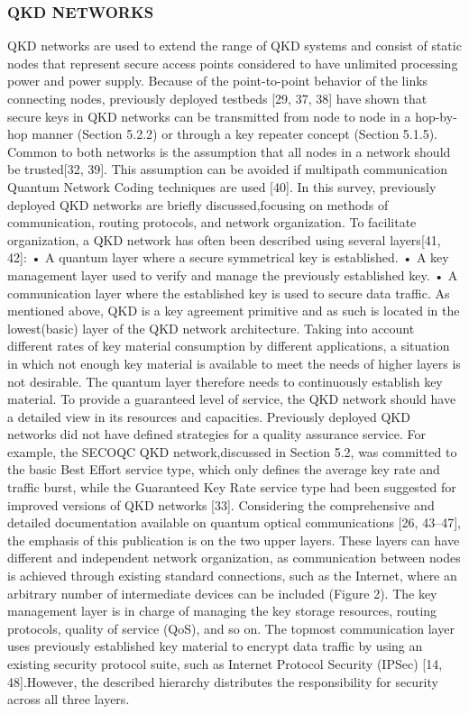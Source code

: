 \subsubsection{QKD NETWORKS}
QKD networks are used to extend the range of QKD systems and consist of static nodes that represent secure access points considered to have unlimited processing power and power supply. Because of the point-to-point behavior of the links connecting nodes, previously deployed testbeds [29, 37, 38] have shown that secure keys in QKD networks can be transmitted from node to node in a hop-by-hop manner (Section 5.2.2) or through a key repeater concept (Section 5.1.5).
Common to both networks is the assumption that all nodes in a network should be trusted[32, 39]. This assumption can be avoided if multipath communication Quantum Network Coding techniques are used [40]. In this survey, previously deployed QKD networks are briefly discussed,focusing on methods of communication, routing protocols, and network organization.
To facilitate organization, a QKD network has often been described using several layers[41, 42]:
• A quantum layer where a secure symmetrical key is established.
• A key management layer used to verify and manage the previously established key.
• A communication layer where the established key is used to secure data traffic.
As mentioned above, QKD is a key agreement primitive and as such is located in the lowest(basic) layer of the QKD network architecture. Taking into account different rates of key material consumption by different applications, a situation in which not enough key material is available to meet the needs of higher layers is not desirable. The quantum layer therefore needs to continuously establish key material. To provide a guaranteed level of service, the QKD network should have a detailed view in its resources and capacities. Previously deployed QKD networks did not have defined strategies for a quality assurance service. For example, the SECOQC QKD network,discussed in Section 5.2, was committed to the basic Best Effort service type, which only defines the average key rate and traffic burst, while the Guaranteed Key Rate service type had been suggested for improved versions of QKD networks [33].
Considering the comprehensive and detailed documentation available on quantum optical communications [26, 43–47], the emphasis of this publication is on the two upper layers. These layers can have different and independent network organization, as communication between nodes is achieved through existing standard connections, such as the Internet, where an arbitrary number of intermediate devices can be included (Figure 2). The key management layer is in charge of managing the key storage resources, routing protocols, quality of service (QoS), and so on. The topmost communication layer uses previously established key material to encrypt data traffic by using an existing security protocol suite, such as Internet Protocol Security (IPSec) [14, 48].However, the described hierarchy distributes the responsibility for security across all three layers.
